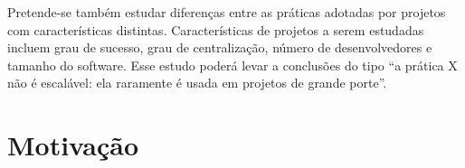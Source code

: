 \documentclass{article}
\begin{document}
Pretende-se também estudar diferenças entre as práticas adotadas por projetos
com características distintas. Características de projetos a serem estudadas
incluem grau de sucesso, grau de centralização, número de desenvolvedores e
tamanho do software. Esse estudo poderá levar a conclusões do tipo ``a prática X
não é escalável: ela raramente é usada em projetos de grande porte''. 


%
%


\section{Motivação}
\end{document}
